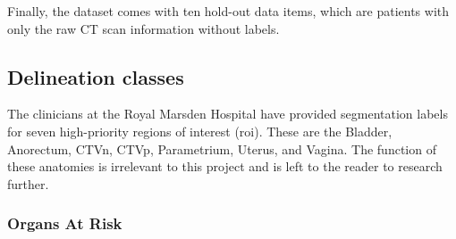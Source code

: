 \documentclass[12pt,twoside]{report}
\begin{document}
Finally, the dataset comes with ten hold-out data items, which are patients with only the raw CT scan information without labels.





\subsection{Delineation classes}

The clinicians at the Royal Marsden Hospital have provided segmentation labels for seven high-priority regions of interest (roi). These are the Bladder, Anorectum, CTVn, CTVp, Parametrium, Uterus, and Vagina. The function of these anatomies is irrelevant to this project and is left to the reader to research further.

\subsubsection{Organs At Risk}\label{sec:data-organs-at-risk}
\end{document}
